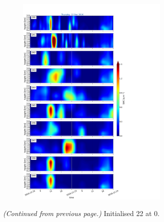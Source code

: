 \begin{figure}[h]\ContinuedFloat
	\centering
	\begin{subfigure}[t]{\textwidth} 
		\centering
		\includegraphics[trim={0cm 0cm 18.3cm 5.1cm},clip,width=0.8\textwidth]{./fig_09EM/20161222}
		\caption{}\label{fig:EM09_22}
	\end{subfigure}
    \caption{\textit{(Continued from previous page.)} Initialised \SI{22}{\dec} at \SI{0}{\UTC}. } 
\end{figure}
